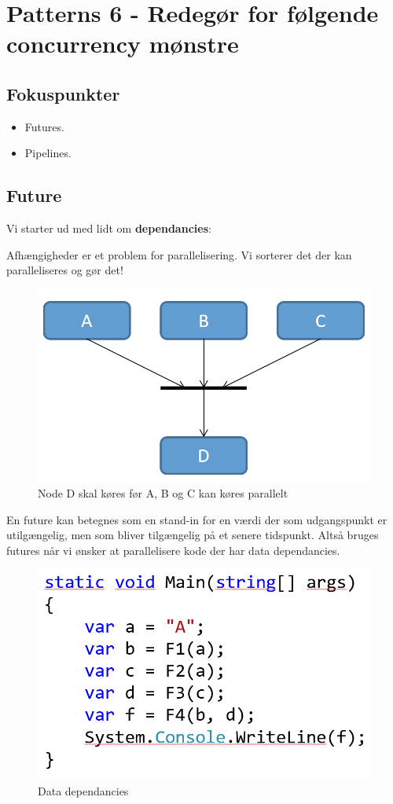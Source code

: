 \section{Patterns 6 - Redegør for følgende concurrency mønstre}

\subsection{Fokuspunkter}

\begin{itemize}
	\item Futures.
	\item Pipelines.
\end{itemize}

\subsection{Future}
Vi starter ud med lidt om \textbf{dependancies}:

Afhængigheder er et problem for parallelisering.
Vi sorterer det der kan paralleliseres og gør det!

\begin{figure}[h]
\centering
\includegraphics[width=0.5\linewidth]{figs/pipeFut/dependancies.PNG}
\caption{Node D skal køres før A, B og C kan køres parallelt}
\label{fig:dependancies}
\end{figure}

En future kan betegnes som en stand-in for en værdi der som udgangspunkt er utilgængelig, men som bliver tilgængelig på et senere tidspunkt.
Altså bruges futures når vi ønsker at parallelisere kode der har data dependancies.

\begin{figure}[h]
	\centering
	\includegraphics[width=0.5\linewidth]{figs/pipeFut/parallelThis.PNG}
	\caption{Data dependancies}
	\label{fig:Datadependancies}
\end{figure}

